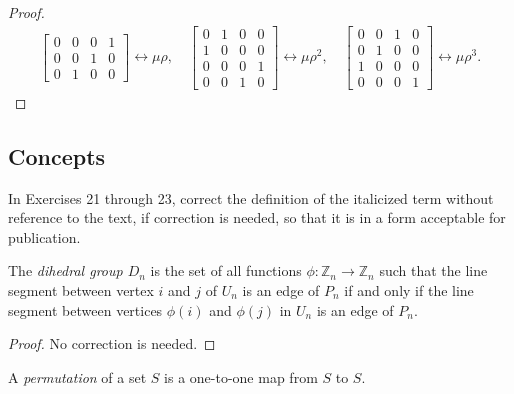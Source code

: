 \begin{proof}
\[\begin{split}
\begin{bmatrix}
                0 & 0 & 0 & 1 \\
                0 & 0 & 1 & 0 \\
                0 & 1 & 0 & 0
            \end{bmatrix}\leftrightarrow\mu\rho,\quad
            \begin{bmatrix}
                0 & 1 & 0 & 0 \\
                1 & 0 & 0 & 0 \\
                0 & 0 & 0 & 1 \\
                0 & 0 & 1 & 0
            \end{bmatrix}\leftrightarrow\mu\rho^{2},\quad
            \begin{bmatrix}
                0 & 0 & 1 & 0 \\
                0 & 1 & 0 & 0 \\
                1 & 0 & 0 & 0 \\
                0 & 0 & 0 & 1
            \end{bmatrix}\leftrightarrow\mu\rho^{3}.
        \end{split}
    \]
\end{proof}

\subsection*{Concepts}

In Exercises 21 through 23, correct the definition of the italicized term without reference to the text, if correction is needed, so that it is in a form acceptable for publication.

\newpage
\begin{exercise}
    The \textit{dihedral group $D_{n}$} is the set of all functions $\phi: \mathbb{Z}_{n} \to \mathbb{Z}_{n}$ such that the line segment between vertex $i$ and $j$ of $U_{n}$ is an edge of $P_{n}$ if and only if the line segment between vertices $\phi(i)$ and $\phi(j)$ in $U_{n}$ is an edge of $P_{n}$.
\end{exercise}

\begin{proof}
    No correction is needed.
\end{proof}

\newpage
\begin{exercise}
    A \textit{permutation} of a set $S$ is a one-to-one map from $S$ to $S$.
\end{exercise}

